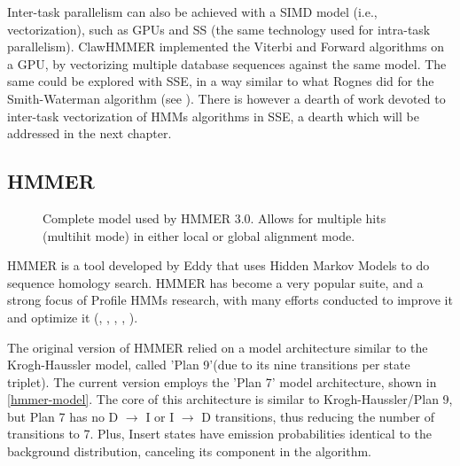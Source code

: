 Inter-task parallelism can also be achieved with a SIMD model (i.e., vectorization), such as GPUs and SS (the same technology used for intra-task parallelism). ClawHMMER \cite{clawhmmer} implemented the Viterbi and Forward algorithms on a GPU, by vectorizing multiple database sequences against the same model. The same could be explored with SSE, in a way similar to what Rognes did for the Smith-Waterman algorithm (see ). There is however a dearth of work devoted to inter-task vectorization of HMMs algorithms in SSE, a dearth which will be addressed in the next chapter.



\subsection{HMMER}

\begin{figure}[htb!]
  \begin{center}
    \caption[HMMER general model] {Complete model used by HMMER 3.0. Allows for multiple hits (multihit mode) in either local or global alignment mode. }
    \label{hmmer-model}
  \end{center}
\end{figure}

HMMER is a tool developed by Eddy \cite{eddy1998profile} that uses Hidden Markov Models to do sequence homology search. HMMER has become a very popular suite, and a strong focus of Profile \acp{HMM} research, with many efforts conducted to improve it and optimize it (\cite{hmmer-fpgas}, \cite{hmmer-gpus}, \cite{lindahl}, \cite{hmmer-mpi}, \cite{clawhmmer}).

The original version of HMMER relied on a model architecture similar to the Krogh-Haussler model, called 'Plan 9'(due to its nine transitions per state triplet). The current version employs the 'Plan 7' model architecture, shown in \autoref{hmmer-model}. The core of this architecture is similar to Krogh-Haussler/Plan 9, but Plan 7 has no D $\rightarrow$ I or I $\rightarrow$ D transitions, thus reducing the number of transitions to 7. Plus, Insert states have emission probabilities identical to the background distribution, canceling its component in the algorithm. 

